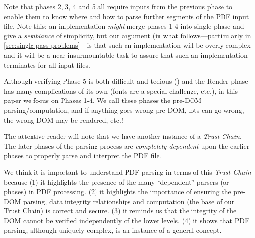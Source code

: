 Note that phases 2, 3, 4 and 5
all require inputs from the previous phase to enable them to know where and
how to parse further segments of the PDF input file.
%
Note this: an implementation \emph{might} merge phases 1-4 into single phase
and give a \emph{semblance} of simplicity, but our argument (in what
follows---particularly in \cref{sec:single-pass-problems}---is that
such an implementation will be overly complex and
it will be a near insurmountable task to assure that such an implementation
terminates for all input files.


Although verifying Phase 5 is both difficult and tedious
()
and the Render phase has many complications of its own (fonts are
a special challenge, etc.), in this paper we focus on Phases 1-4.
We call these phases the pre-DOM parsing/computation, and if anything
goes wrong pre-DOM, lots can go wrong, the wrong DOM may be rendered, etc.!

The attentive reader will note that we have another instance of a \emph{Trust
Chain}.  The later phases of the parsing process are \emph{completely
dependent} upon the earlier phases to properly parse and interpret the PDF
file.

We think it is important to understand PDF parsing in terms of this
\emph{Trust Chain} because
%
(1) it highlights the presence of the many ``dependent'' parsers (or phases)
in PDF processing.
%
(2) it highlights the importance of ensuring the pre-DOM parsing, data integrity relationships and
computation (the base of our Trust Chain) is correct and secure.
%
(3) it reminds us that the integrity of the DOM cannot be verified
independently of the lower levels.
(4) it shows that PDF parsing, although uniquely complex, is an instance of
a general concept.

